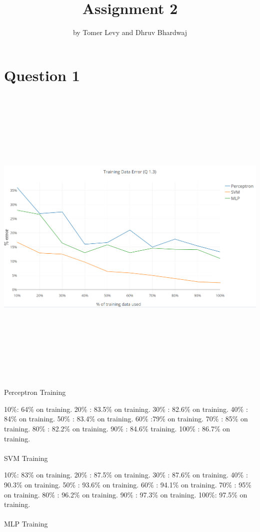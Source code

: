 \documentclass{article}
\title{Assignment 2}
\author{by Tomer Levy and Dhruv Bhardwaj}
\begin{document}
\maketitle

\section{Question 1}
\includegraphics[width=15cm,height=15cm,keepaspectratio]{"Question1AI3"}

{\LARGE Perceptron Training}

10\%: 64\%  on training.
20\% : 83.5\% on training.
30\% : 82.6\% on training.
40\% : 84\% on training.
50\% : 83.4\% on training.
60\% :79\% on training.
70\% : 85\% on training.
80\% : 82.2\% on training.
90\% : 84.6\% training.
100\% : 86.7\% on training.
\\
\\
{\LARGE SVM Training}

10\%: 83\%  on training.
20\% : 87.5\% on training.
30\% : 87.6\% on training.
40\% : 90.3\% on training.
50\% : 93.6\% on training.
60\% : 94.1\% on training.
70\% : 95\% on training.
80\% : 96.2\% on training.
90\% : 97.3\% on training.
100\%: 97.5\% on training.
\\
\\
{\LARGE MLP Training}
\end{document}
